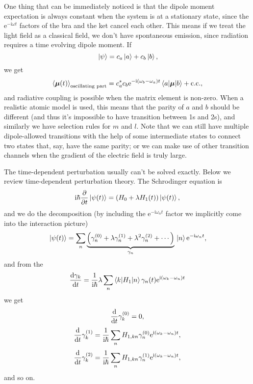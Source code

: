 \documentclass[hyperref, a4paper]{article}
\newcommand*{\ii}{\mathrm{i}}
\newcommand*{\ee}{\mathrm{e}}
\begin{document}
One thing that can be immediately noticed is that 
the dipole moment expectation is always constant 
when the system is at a stationary state, 
since the $\ee^{- \ii \omega t}$ factors
of the bra and the ket cancel each other.
This means if we treat the light field as a classical field, 
we don't have spontaneous emission,
since radiation requires a time evolving dipole moment.
If 
\begin{equation}
    \ket*{\psi} = c_a \ket*{a} + c_b \ket*{b},
\end{equation}
we get 
\begin{equation}
    \expval{\vb*{\mu}(t)}_{\text{oscillating part}} = 
    c^*_a c_b \ee^{- \ii (\omega_b - \omega_a) t} \mel**{a}{\vb*{\mu}}{b} + \text{c.c.},
\end{equation}
and radiative coupling is possible when the matrix element is non-zero.
When a realistic atomic model is used,
this means that the parity of $a$ and $b$ should be different 
(and thus it's impossible to have transition between 1s and 2s),
and similarly we have selection rules for $m$ and $l$.
Note that we can still have multiple dipole-allowed transitions 
with the help of some intermediate states 
to connect two states that, say, have the same parity;
or we can make use of other transition channels
when the gradient of the electric field is truly large.

The time-dependent perturbation usually can't be solved exactly.
Below we review time-dependent perturbation theory.
The Schrodinger equation is 
\begin{equation}
    \ii \hbar \pdv{t} \ket*{\psi(t)} = 
    (H_0 + \lambda H_1(t)) \ket*{\psi(t)},
\end{equation}
and we do the decomposition 
(by including the $\ee^{- \ii \omega_n t}$ factor 
we implicitly come into the interaction picture)
\begin{equation}
    \ket*{\psi(t)} = \sum_{n} \underbrace{  \left(
        \gamma_n^{(0)} + \lambda \gamma_n^{(1)} + \lambda^2 \gamma_n^{(2)} + \cdots
    \right) }_{\gamma_n} \ket*{n} \ee^{- \ii \omega_n t}, 
\end{equation}
and from the 
\begin{equation}
    \dv{\gamma_k}{t} = \frac{1}{\ii \hbar} \lambda \sum_n \mel**{k}{H_1}{n} \gamma_n (t) 
    \ee^{\ii (\omega_k - \omega_n) t}
\end{equation}
we get 
\begin{equation}
    \dv{t} \gamma^{(0)}_k = 0,
\end{equation}
\begin{equation}
    \dv{t} \gamma^{(1)}_k = \frac{1}{\ii \hbar} \sum_n H_{1, kn} 
    \gamma^{(0)}_n \ee^{\ii (\omega_k - \omega_n) t},
\end{equation}
\begin{equation}
    \dv{t} \gamma^{(2)}_k = \frac{1}{\ii \hbar} \sum_n H_{1, kn} 
    \gamma^{(1)}_n \ee^{\ii (\omega_k - \omega_n) t},
\end{equation}
and so on.  
\end{document}
